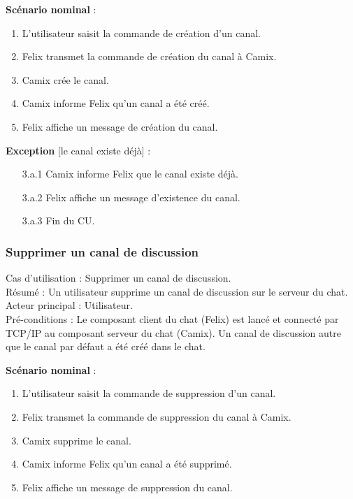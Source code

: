 \medskip
\textbf{Scénario nominal} :
\begin{enumerate}
\item L'utilisateur saisit la commande de création d'un canal.
\item Felix transmet la commande de création du canal à Camix.
\item Camix crée le canal.
\item Camix informe Felix qu'un canal a été créé.
\item Felix affiche un message de création du canal.
\end{enumerate}

\newpage
\textbf{Exception} [le canal existe déjà] :
\begin{enumerate}
\item[3.a.1] Camix informe Felix que le canal existe déjà.
\item[3.a.2] Felix affiche un message d'existence du canal.
\item[3.a.3] Fin du CU.
\end{enumerate}

\subsubsection{Supprimer un canal de discussion}
\label{sec:cu:canaux:supprimer}

\noindent
Cas d'utilisation : Supprimer un canal de discussion.\\
Résumé : Un utilisateur supprime un canal de discussion sur le serveur du chat.\\
Acteur principal : Utilisateur.\\
Pré-conditions : Le composant client du chat (Felix) est lancé et connecté par TCP/IP au composant serveur du chat (Camix). Un canal de discussion autre que le canal par défaut a été créé dans le chat.

\medskip
\textbf{Scénario nominal} :
\begin{enumerate}
\item L'utilisateur saisit la commande de suppression d'un canal.
\item Felix transmet la commande de suppression du canal à Camix.
\item Camix supprime le canal.
\item Camix informe Felix qu'un canal a été supprimé.
\item Felix affiche un message de suppression du canal.
\end{enumerate}


